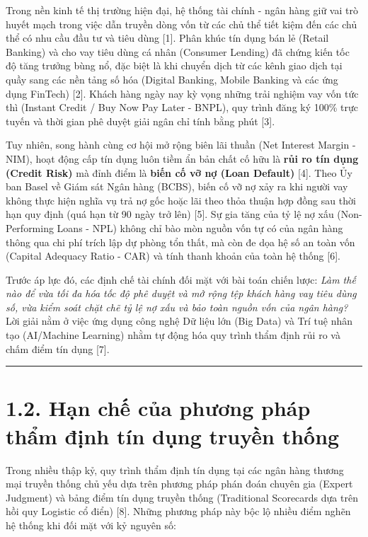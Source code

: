 \documentclass[
  13pt,
  a4paper,
]{report}
\begin{document}
Trong nền kinh tế thị trường hiện đại, hệ thống tài chính - ngân hàng
giữ vai trò huyết mạch trong việc dẫn truyền dòng vốn từ các chủ thể
tiết kiệm đến các chủ thể có nhu cầu đầu tư và tiêu dùng {[}1{]}. Phân
khúc tín dụng bán lẻ (Retail Banking) và cho vay tiêu dùng cá nhân
(Consumer Lending) đã chứng kiến tốc độ tăng trưởng bùng nổ, đặc biệt là
khi chuyển dịch từ các kênh giao dịch tại quầy sang các nền tảng số hóa
(Digital Banking, Mobile Banking và các ứng dụng FinTech) {[}2{]}. Khách
hàng ngày nay kỳ vọng những trải nghiệm vay vốn tức thì (Instant Credit
/ Buy Now Pay Later - BNPL), quy trình đăng ký 100\% trực tuyến và thời
gian phê duyệt giải ngân chỉ tính bằng phút {[}3{]}.

Tuy nhiên, song hành cùng cơ hội mở rộng biên lãi thuần (Net Interest
Margin - NIM), hoạt động cấp tín dụng luôn tiềm ẩn bản chất cố hữu là
\textbf{rủi ro tín dụng (Credit Risk)} mà đỉnh điểm là \textbf{biến cố
vỡ nợ (Loan Default)} {[}4{]}. Theo Ủy ban Basel về Giám sát Ngân hàng
(BCBS), biến cố vỡ nợ xảy ra khi người vay không thực hiện nghĩa vụ trả
nợ gốc hoặc lãi theo thỏa thuận hợp đồng sau thời hạn quy định (quá hạn
từ 90 ngày trở lên) {[}5{]}. Sự gia tăng của tỷ lệ nợ xấu
(Non-Performing Loans - NPL) không chỉ bào mòn nguồn vốn tự có của ngân
hàng thông qua chi phí trích lập dự phòng tổn thất, mà còn đe dọa hệ số
an toàn vốn (Capital Adequacy Ratio - CAR) và tính thanh khoản của toàn
hệ thống {[}6{]}.

Trước áp lực đó, các định chế tài chính đối mặt với bài toán chiến lược:
\emph{Làm thế nào để vừa tối đa hóa tốc độ phê duyệt và mở rộng tệp
khách hàng vay tiêu dùng số, vừa kiểm soát chặt chẽ tỷ lệ nợ xấu và bảo
toàn nguồn vốn của ngân hàng?} Lời giải nằm ở việc ứng dụng công nghệ Dữ
liệu lớn (Big Data) và Trí tuệ nhân tạo (AI/Machine Learning) nhằm tự
động hóa quy trình thẩm định rủi ro và chấm điểm tín dụng {[}7{]}.

\begin{center}\rule{0.5\linewidth}{0.5pt}\end{center}

\section{1.2. Hạn chế của phương pháp thẩm định tín dụng truyền
thống}\label{hux1ea1n-chux1ebf-cux1ee7a-phux1b0ux1a1ng-phuxe1p-thux1ea9m-ux111ux1ecbnh-tuxedn-dux1ee5ng-truyux1ec1n-thux1ed1ng}

Trong nhiều thập kỷ, quy trình thẩm định tín dụng tại các ngân hàng
thương mại truyền thống chủ yếu dựa trên phương pháp phán đoán chuyên
gia (Expert Judgment) và bảng điểm tín dụng truyền thống (Traditional
Scorecards dựa trên hồi quy Logistic cổ điển) {[}8{]}. Những phương pháp
này bộc lộ nhiều điểm nghẽn hệ thống khi đối mặt với kỷ nguyên số:
\end{document}
